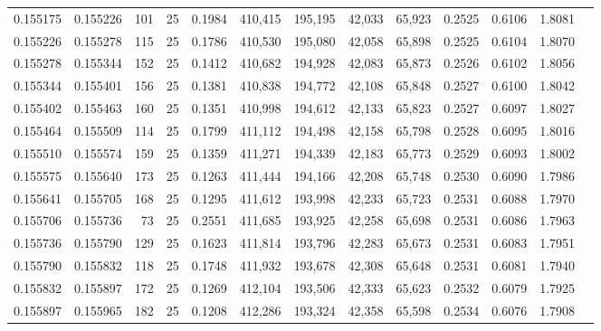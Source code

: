 \begin{tabular}{rrrrrrrrrrrrr}
0.155175 & 0.155226 &   101 &  25 &                                     0.1984 & 410,415 & 195,195 &  42,033 &  65,923 & 0.2525 & 0.6106 & 1.8081 \\
0.155226 & 0.155278 &   115 &  25 &                                     0.1786 & 410,530 & 195,080 &  42,058 &  65,898 & 0.2525 & 0.6104 & 1.8070 \\
0.155278 & 0.155344 &   152 &  25 &                                     0.1412 & 410,682 & 194,928 &  42,083 &  65,873 & 0.2526 & 0.6102 & 1.8056 \\
0.155344 & 0.155401 &   156 &  25 &                                     0.1381 & 410,838 & 194,772 &  42,108 &  65,848 & 0.2527 & 0.6100 & 1.8042 \\
0.155402 & 0.155463 &   160 &  25 &                                     0.1351 & 410,998 & 194,612 &  42,133 &  65,823 & 0.2527 & 0.6097 & 1.8027 \\
0.155464 & 0.155509 &   114 &  25 &                                     0.1799 & 411,112 & 194,498 &  42,158 &  65,798 & 0.2528 & 0.6095 & 1.8016 \\
0.155510 & 0.155574 &   159 &  25 &                                     0.1359 & 411,271 & 194,339 &  42,183 &  65,773 & 0.2529 & 0.6093 & 1.8002 \\
0.155575 & 0.155640 &   173 &  25 &                                     0.1263 & 411,444 & 194,166 &  42,208 &  65,748 & 0.2530 & 0.6090 & 1.7986 \\
0.155641 & 0.155705 &   168 &  25 &                                     0.1295 & 411,612 & 193,998 &  42,233 &  65,723 & 0.2531 & 0.6088 & 1.7970 \\
0.155706 & 0.155736 &    73 &  25 &                                     0.2551 & 411,685 & 193,925 &  42,258 &  65,698 & 0.2531 & 0.6086 & 1.7963 \\
0.155736 & 0.155790 &   129 &  25 &                                     0.1623 & 411,814 & 193,796 &  42,283 &  65,673 & 0.2531 & 0.6083 & 1.7951 \\
0.155790 & 0.155832 &   118 &  25 &                                     0.1748 & 411,932 & 193,678 &  42,308 &  65,648 & 0.2531 & 0.6081 & 1.7940 \\
0.155832 & 0.155897 &   172 &  25 &                                     0.1269 & 412,104 & 193,506 &  42,333 &  65,623 & 0.2532 & 0.6079 & 1.7925 \\
0.155897 & 0.155965 &   182 &  25 &                                     0.1208 & 412,286 & 193,324 &  42,358 &  65,598 & 0.2534 & 0.6076 & 1.7908 \\

\end{tabular}
